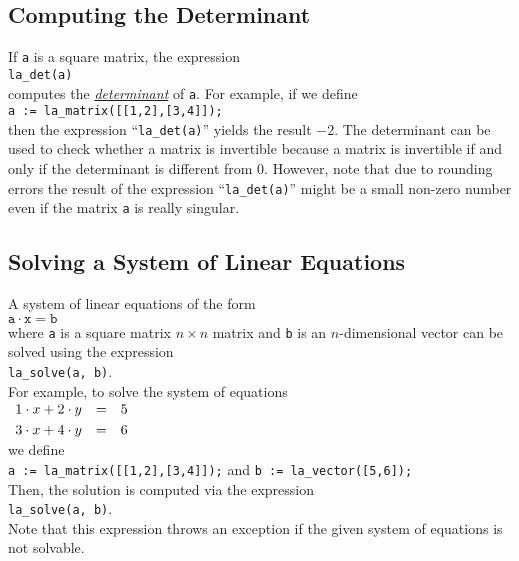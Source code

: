 \subsection{Computing the Determinant}
If \texttt{a} is a square matrix, the expression 
\\[0.2cm]
\hspace*{1.3cm}
\texttt{la\_det(a)}
\\[0.2cm]
computes the \href{http://en.wikipedia.org/wiki/Determinant}{\emph{determinant}} of \texttt{a}.
For example, if we define 
\\[0.2cm]
\hspace*{1.3cm}
\texttt{a := la\_matrix([[1,2],[3,4]]);}
\\[0.2cm]
then the expression ``\texttt{la\_det(a)}'' yields the result $-2$.  The determinant can be used to
check whether a matrix is invertible because a matrix is invertible if and only if the determinant
is different from $0$.  However, note that due to rounding errors the result of the expression 
``\texttt{la\_det(a)}''  might be a small non-zero number even if the matrix \texttt{a} is really
singular. 

\subsection{Solving a System of Linear Equations}
A system of linear equations of the form
\\[0.2cm]
\hspace*{1.3cm}
$\texttt{a} \cdot \texttt{x} = \texttt{b}$
\\[0.2cm]
where \texttt{a} is a square matrix $n \times n$  matrix and  \texttt{b} is an $n$-dimensional
vector can be solved using the expression
\\[0.2cm]
\hspace*{1.3cm}
\texttt{la\_solve(a, b)}.
\\[0.2cm]
For example, to solve the system of equations
\\[0.2cm]
\hspace*{1.3cm}
$
\begin{array}[c]{lcl}
  1 \cdot x + 2 \cdot y & = & 5 \\[0.1cm]
  3 \cdot x + 4 \cdot y & = & 6 
\end{array}
$
\\[0.2cm]
we define
\\[0.2cm]
\hspace*{1.3cm}
\texttt{a := la\_matrix([[1,2],[3,4]]);} \quad and \quad \texttt{b := la\_vector([5,6]);}
\\[0.2cm]
Then, the solution is computed via the expression
\\[0.2cm]
\hspace*{1.3cm}
\texttt{la\_solve(a, b)}.
\\[0.2cm]
Note that this expression throws an exception if the given system of equations is not solvable.

